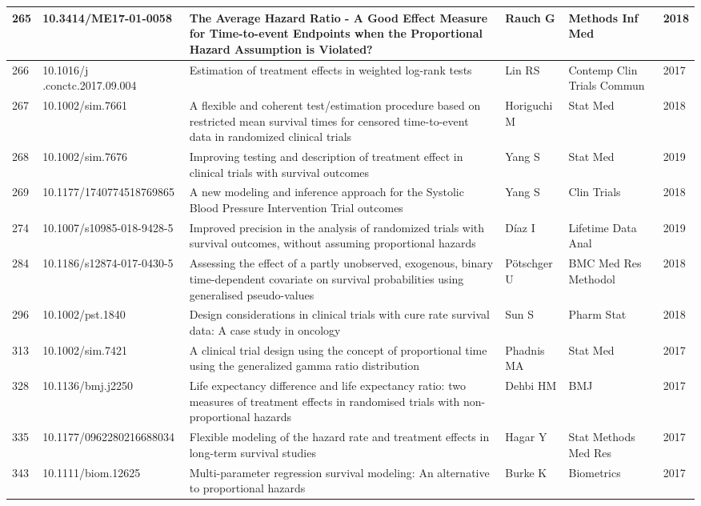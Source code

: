\begin{landscape}
\begin{longtable}{|p{0.3in}|p{1.8in}|p{2.4in}|p{0.68in}|p{0.89in}|p{0.3in}|}
265 & 10.3414/ME17-01-0058   & The Average Hazard Ratio - A Good Effect Measure for Time-to-event Endpoints when the Proportional Hazard Assumption is Violated? & Rauch G & Methods Inf Med & 2018 \\ \hline 
266 & 10.1016/j .conctc.2017.09.004 & Estimation of treatment effects in weighted log-rank tests & Lin RS & Contemp Clin Trials Commun & 2017 \\ \hline 
267 & 10.1002/sim.7661   & A flexible and coherent test/estimation procedure based on restricted mean survival times for censored time-to-event data in randomized clinical trials & Horiguchi M & Stat Med & 2018 \\ \hline 
268 & 10.1002/sim.7676    & Improving testing and description of treatment effect in clinical trials with survival outcomes & Yang S & Stat Med & 2019 \\ \hline 
269 & 10.1177/1740774518769865    & A new modeling and inference approach for the Systolic Blood Pressure Intervention Trial outcomes & Yang S & Clin Trials & 2018 \\ \hline 
274 & 10.1007/s10985-018-9428-5    & Improved precision in the analysis of randomized trials with survival outcomes, without assuming proportional hazards & D\'{i}az I & Lifetime Data Anal & 2019 \\ \hline 
284 & 10.1186/s12874-017-0430-5   & Assessing the effect of a partly unobserved, exogenous, binary time-dependent covariate on survival probabilities using generalised pseudo-values & P\"{o}tschger U & BMC Med Res Methodol & 2018 \\ \hline 
296 & 10.1002/pst.1840  & Design considerations in clinical trials with cure rate survival data: A case study in oncology & Sun S & Pharm Stat & 2018 \\ \hline 
313 & 10.1002/sim.7421   & A clinical trial design using the concept of proportional time using the generalized gamma ratio distribution & Phadnis MA & Stat Med & 2017 \\ \hline 
328 & 10.1136/bmj.j2250  & Life expectancy difference and life expectancy ratio: two measures of treatment effects in randomised trials with non-proportional hazards & Dehbi HM & BMJ & 2017 \\ \hline 
335 & 10.1177/0962280216688034   & Flexible modeling of the hazard rate and treatment effects in long-term survival studies & Hagar Y & Stat Methods Med Res & 2017 \\ \hline 
343 & 10.1111/biom.12625  & Multi-parameter regression survival modeling: An alternative to proportional hazards & Burke K & Biometrics & 2017 \\ \hline 

\end{longtable}
\end{landscape}
